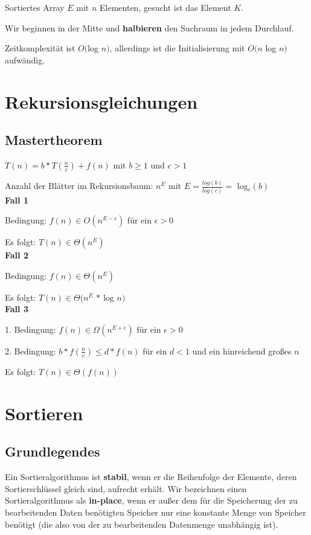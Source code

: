\documentclass[12pt]{article}
\begin{document}
Sortiertes Array $E$ mit $n$ Elementen, gesucht ist das Element $K$.

Wir beginnen in der Mitte und \textbf{halbieren} den Suchraum in jedem Durchlauf.

Zeitkomplexität ist $O($log $n)$, allerdings ist die Initialisierung mit $O(n $ log $ n)$ aufwändig.

\section{Rekursionsgleichungen}

\subsection{Mastertheorem}

$T(n) = b * T(\frac{n}{c}) + f(n)$ mit $b \geq 1$ und $c > 1$

Anzahl der Blätter im Rekursionsbaum: $n^E$ mit $E = \frac{log(b)}{log(c)} = $ log$_c(b)$\\

\textbf{Fall 1}

Bedingung: $f(n) \in O(n^{E-\epsilon})$ für ein $\epsilon > 0$

Es folgt: $T(n) \in \Theta(n^E)$\\

\textbf{Fall 2}

Bedingung: $f(n) \in \Theta(n^{E})$

Es folgt: $T(n) \in \Theta(n^E$ $*$ log $n)$\\

\textbf{Fall 3}

1. Bedingung: $f(n) \in \Omega(n^{E+\epsilon})$ für ein $\epsilon > 0$

2. Bedingung: $b*f(\frac{n}{c}) \leq d * f(n)$ für ein $d < 1$ und ein hinreichend großes $n$

Es folgt: $T(n) \in \Theta(f(n))$

\section{Sortieren}

\subsection{Grundlegendes}

Ein Sortieralgorithmus ist \textbf{stabil}, wenn er die Reihenfolge der Elemente, deren Sortierschlüssel gleich sind, aufrecht erhält. Wir bezeichnen einen Sortieralgorithmus als \textbf{in-place}, wenn er außer dem für die Speicherung der zu bearbeitenden Daten benötigten Speicher nur eine konstante Menge von Speicher benötigt (die also von der zu bearbeitenden Datenmenge unabhängig ist).
\end{document}
